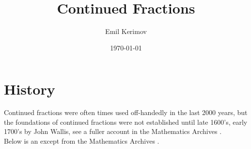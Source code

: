 \documentclass[a4paper]{article}
\title{Continued Fractions}
\author{Emil Kerimov}
\date{\today}
\begin{document}
\maketitle

\newtheorem{theorem}{Theorem}[section]
\newtheorem{corollary}{Corollary}[theorem]
\newtheorem{lemma}[theorem]{Lemma}
\newtheorem{definition}{Definition}[section]

\def\CFDots{
\genfrac{}{}{0pt}{0}{}{\ddots}
}

\section{History}
Continued fractions were often times used off-handedly in the last 2000 years, but the foundations of continued fractions were not established until late 1600's, early 1700's by John Wallis, see a fuller account in the Mathematics Archives \cite{history_website}.
\\
Below is an except from the Mathematics Archives \cite{history_website}. 
\end{document}
